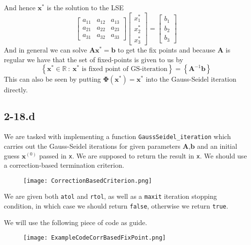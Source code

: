 \documentclass{article}
\begin{document}
And hence $\mathbf{x}^{*}$ is the solution to the LSE
\begin{equation*}
    \begin{bmatrix}
    a_{11} & a_{12} & a_{13} \\
    a_{21} & a_{22} & a_{23} \\
    a_{31} & a_{32} & a_{33}
    \end{bmatrix} \begin{bmatrix}
        x^{*}_{1} \\x^{*}_{2} \\ x^{*}_{3}
    \end{bmatrix}
    = \begin{bmatrix}
        b_{1} \\ b_{2} \\b_{3}
    \end{bmatrix}
\end{equation*}
And in general we can solve $\mathbf{A}\mathbf{x}^{*} = \mathbf{b}$ to get the fix points and because $\mathbf{A}$ is regular we have that the set of fixed-points is given to us by
\begin{equation*}
    \left\{\mathbf{x}^{*} \in \mathbb{R} \::\: \mathbf{x}^{*} \text{ is fixed point of GS-iteration}\right\} = \left\{\mathbf{A}^{-1}\mathbf{b}\right\}
\end{equation*}
This can also be seen by putting $\mathbf{\Phi}\left(\mathbf{x}^{*}\right)  = \mathbf{x}^{*}$ into the Gauss-Seidel iteration directly. 
\subsection*{2-18.d}
We are tasked with implementing a function \verb|GaussSeidel_iteration| which carries out the Gauss-Seidel iterations for given parameters $\mathbf{A}$,$\mathbf{b}$ and an initial guess $\mathbf{x}^{\left(0\right)}$ passed in \verb|x|. We are supposed to return the result in \verb|x|. We should use a correction-based termination criterion.
\begin{figure}[!hbt]
    \centering
\texttt{[image: CorrectionBasedCriterion.png]}
\end{figure}
We are given both \verb|atol| and \verb|rtol|, as well as a \verb|maxit| iteration stopping condition, in which case we should return \verb|false|, otherwise we return \verb|true|. 

\pagebreak

\noindent We will use the following piece of code as guide.
\begin{figure}[!hbt]
    \centering
\texttt{[image: ExampleCodeCorrBasedFixPoint.png]}
\end{figure}
\end{document}

